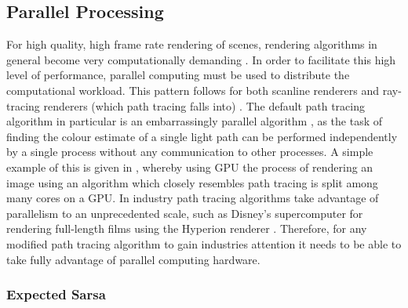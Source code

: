 \documentclass[../dissertation.tex]{subfiles}
\begin{document}

\subsection{Parallel Processing}

For high quality, high frame rate rendering of scenes, rendering algorithms in general become very computationally demanding \cite{crockett1995parallel}. In order to facilitate this high level of performance, parallel computing must be used to distribute the computational workload. This pattern follows for both scanline renderers and ray-tracing renderers (which path tracing falls into) \cite{alerstam2008parallel, fatahalian2009data}. The default path tracing algorithm in particular is an embarrassingly parallel algorithm \cite{embarissingly_parallelizable}, as the task of finding the colour estimate of a single light path can be performed independently by a single process without any communication to other processes. A simple example of this is given in \cite{accelerated_ray_tracing}, whereby using GPU the process of rendering an image using an algorithm which closely resembles path tracing is split among many cores on a GPU. In industry path tracing algorithms take advantage of parallelism to an unprecedented scale, such as Disney's supercomputer for rendering full-length films using the Hyperion renderer \cite{hyperion}. Therefore, for any modified path tracing algorithm to gain industries attention it needs to be able to take fully advantage of parallel computing hardware.\\

\subsubsection{Expected Sarsa}
\end{document}
